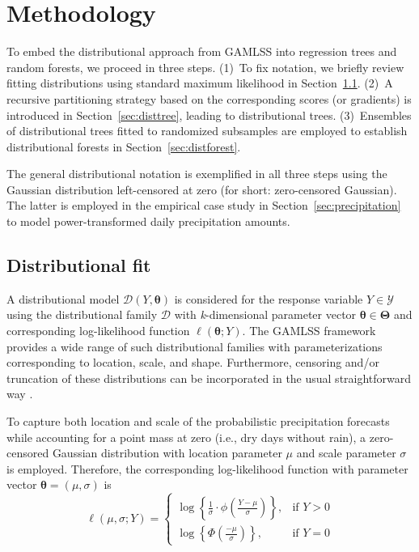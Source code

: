 \documentclass[aoas, preprint]{imsart}
\numberwithin{equation}{subsection}
\begin{document}
\pagebreak
\section{Methodology}
\label{sec:methods}

To embed the distributional approach from GAMLSS into regression trees and random
forests, we proceed in three steps. (1)~To fix notation, we briefly review fitting
distributions using standard maximum likelihood in Section~\ref{sec:distfit}.
(2)~A recursive partitioning strategy based on the corresponding scores (or
gradients) is introduced in Section~\ref{sec:disttree}, leading to distributional
trees. (3)~Ensembles of distributional trees fitted to randomized subsamples are
employed to establish distributional forests in Section~\ref{sec:distforest}.

The general distributional notation is exemplified in all three steps using the
Gaussian distribution left-censored at zero (for short: zero-censored Gaussian).
The latter is employed in the empirical case study in Section~\ref{sec:precipitation}
to model power-transformed daily precipitation amounts.


\subsection{Distributional fit}
\label{sec:distfit}

A distributional model $\mathcal{D}(Y, \bm{\theta})$ is considered for the response
variable $Y \in \mathcal{Y}$ using the distributional family $\mathcal{D}$ with
\textit{k}-dimensional parameter vector $\bm{\theta} \in \bm{\Theta}$ and
corresponding log-likelihood function $\ell(\bm{\theta}; Y)$. The GAMLSS
framework \citep{Rigby+Stasinopoulos:2005} provides a wide range of such
distributional families with parameterizations corresponding to location, scale,
and shape. Furthermore, censoring and/or truncation of these distributions
can be incorporated in the usual straightforward way
\citep[see e.g.,][Chapter~7.2]{Long:1997}.

To capture both location and scale of the probabilistic precipitation forecasts
while accounting for a point mass at zero (i.e., dry days without
rain), a zero-censored Gaussian distribution
with location parameter $\mu$ and scale parameter $\sigma$ is employed. Therefore,
the corresponding log-likelihood function with parameter vector 
$\bm{\theta} = (\mu, \sigma)$ is
\begin{equation}
\ell(\mu, \sigma; Y) = 
\begin{cases}
    \log\left\{\frac{1}{\sigma} \cdot \phi\left(\frac{Y - \mu}{\sigma}\right) \right\}, & \text{if } Y > 0\\[0.2cm]
    \log\left\{\Phi\left(\frac{-\mu}{\sigma}\right)\right\}, & \text{if } Y = 0
\end{cases}
\end{equation}
\end{document}

